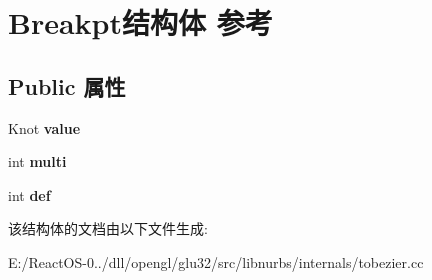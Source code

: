 \hypertarget{struct_breakpt}{}\section{Breakpt结构体 参考}
\label{struct_breakpt}
\subsection*{Public 属性}
\begin{DoxyCompactItemize}
\item 
\mbox{\label{struct_breakpt_ad8f13c52e72fbff6392d7574443e6e32}} 
Knot {\bfseries value}
\item 
\mbox{\label{struct_breakpt_a744f782745e735cfce3a5efc5da2b4a4}} 
int {\bfseries multi}
\item 
\mbox{\label{struct_breakpt_a011b223d02cb9cbe69ab8b65f123cc79}} 
int {\bfseries def}
\end{DoxyCompactItemize}


该结构体的文档由以下文件生成\+:\begin{DoxyCompactItemize}
\item 
E\+:/\+React\+O\+S-\/0../dll/opengl/glu32/src/libnurbs/internals/tobezier.\+cc\end{DoxyCompactItemize}
